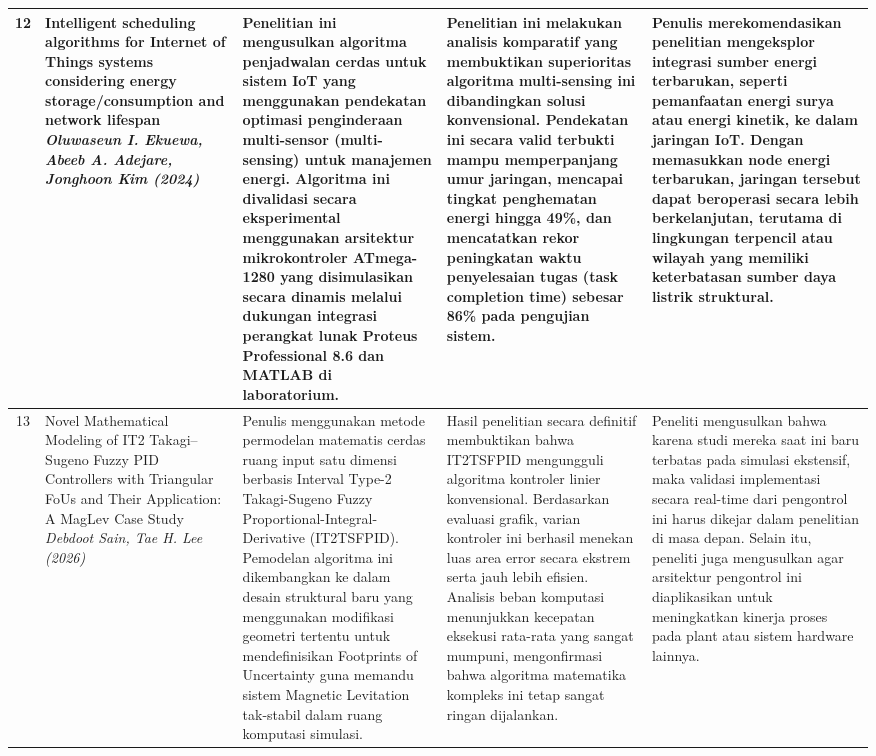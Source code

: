 \documentclass[11pt,a4paper]{article}
\begin{document}
\begin{small}
\begin{longtable}{|c|>{\raggedright\arraybackslash}p{3.2cm}|>{\raggedright\arraybackslash}p{4cm}|>{\raggedright\arraybackslash}p{4cm}|>{\raggedright\arraybackslash}p{4cm}|}
12 & Intelligent scheduling algorithms for Internet of Things systems considering energy storage/consumption and network lifespan \newline \newline \textit{Oluwaseun I. Ekuewa, Abeeb A. Adejare, Jonghoon Kim (2024)} & Penelitian ini mengusulkan algoritma penjadwalan cerdas untuk sistem IoT yang menggunakan pendekatan optimasi penginderaan multi-sensor (multi-sensing) untuk manajemen energi. Algoritma ini divalidasi secara eksperimental menggunakan arsitektur mikrokontroler ATmega-1280 yang disimulasikan secara dinamis melalui dukungan integrasi perangkat lunak Proteus Professional 8.6 dan MATLAB di laboratorium. & Penelitian ini melakukan analisis komparatif yang membuktikan superioritas algoritma multi-sensing ini dibandingkan solusi konvensional. Pendekatan ini secara valid terbukti mampu memperpanjang umur jaringan, mencapai tingkat penghematan energi hingga 49\%, dan mencatatkan rekor peningkatan waktu penyelesaian tugas (task completion time) sebesar 86\% pada pengujian sistem. & Penulis merekomendasikan penelitian mengeksplor integrasi sumber energi terbarukan, seperti pemanfaatan energi surya atau energi kinetik, ke dalam jaringan IoT. Dengan memasukkan node energi terbarukan, jaringan tersebut dapat beroperasi secara lebih berkelanjutan, terutama di lingkungan terpencil atau wilayah yang memiliki keterbatasan sumber daya listrik struktural. \\
\hline

13 & Novel Mathematical Modeling of IT2 Takagi–Sugeno Fuzzy PID Controllers with Triangular FoUs and Their Application: A MagLev Case Study \newline \newline \textit{Debdoot Sain, Tae H. Lee (2026)} & Penulis menggunakan metode permodelan matematis cerdas ruang input satu dimensi berbasis Interval Type-2 Takagi-Sugeno Fuzzy Proportional-Integral-Derivative (IT2TSFPID). Pemodelan algoritma ini dikembangkan ke dalam desain struktural baru yang menggunakan modifikasi geometri tertentu untuk mendefinisikan Footprints of Uncertainty guna memandu sistem Magnetic Levitation tak-stabil dalam ruang komputasi simulasi. & Hasil penelitian secara definitif membuktikan bahwa IT2TSFPID mengungguli algoritma kontroler linier konvensional. Berdasarkan evaluasi grafik, varian kontroler ini berhasil menekan luas area error secara ekstrem serta jauh lebih efisien. Analisis beban komputasi menunjukkan kecepatan eksekusi rata-rata yang sangat mumpuni, mengonfirmasi bahwa algoritma matematika kompleks ini tetap sangat ringan dijalankan. & Peneliti mengusulkan bahwa karena studi mereka saat ini baru terbatas pada simulasi ekstensif, maka validasi implementasi secara real-time dari pengontrol ini harus dikejar dalam penelitian di masa depan. Selain itu, peneliti juga mengusulkan agar arsitektur pengontrol ini diaplikasikan untuk meningkatkan kinerja proses pada plant atau sistem hardware lainnya. \\
\hline


\end{longtable}
\end{small}
\end{document}
